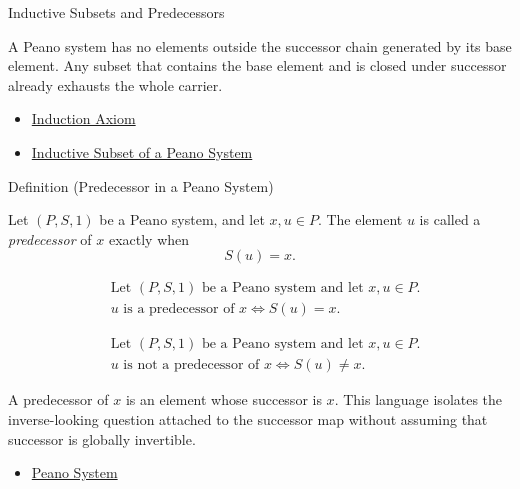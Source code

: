 \begin{topicbox}{Inductive Subsets and Predecessors}
\begin{remark*}[Interpretation]
A Peano system has no elements outside the successor chain generated by its
base element. Any subset that contains the base element and is closed under
successor already exhausts the whole carrier.
\end{remark*}

\begin{dependencies}
\begin{itemize}
  \item \hyperref[ax:peano-induction]{Induction Axiom}
  \item \hyperref[def:inductive-subset-of-peano-system]{Inductive Subset of a Peano System}
\end{itemize}
\end{dependencies}

\begin{definitionbox}{Definition (Predecessor in a Peano System)}
\begin{definition}
\label{def:predecessor-in-peano-system}
Let $(P,S,1)$ be a Peano system, and let $x,u \in P$. The element $u$ is
called a \emph{predecessor} of $x$ exactly when
\[
S(u)=x.
\]
\end{definition}
\end{definitionbox}

\begin{remark*}
\[
\begin{aligned}
&\text{Let } (P,S,1) \text{ be a Peano system and let } x,u \in P.\\
&u \text{ is a predecessor of } x
\Longleftrightarrow
S(u)=x.
\end{aligned}
\]
\end{remark*}

\begin{remark*}
\[
\begin{aligned}
&\text{Let } (P,S,1) \text{ be a Peano system and let } x,u \in P.\\
&u \text{ is not a predecessor of } x
\Longleftrightarrow
S(u) \neq x.
\end{aligned}
\]
\end{remark*}

\begin{remark*}[Interpretation]
A predecessor of $x$ is an element whose successor is $x$. This language
isolates the inverse-looking question attached to the successor map without
assuming that successor is globally invertible.
\end{remark*}

\begin{dependencies}
\begin{itemize}
  \item \hyperref[def:peano-system]{Peano System}
\end{itemize}
\end{dependencies}
\end{topicbox}

